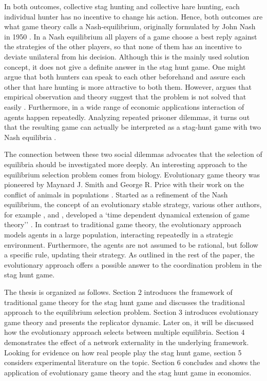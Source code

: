 In both outcomes, collective stag hunting and collective hare hunting,
each individual hunter has no incentive to change his action.
Hence, both outcomes are what game theory calls a Nash-equilibrium, originally
formulated by John Nash in 1950 \parencite{nash_equilibrium_1950}. In a 
Nash equilibrium all players of a game choose a best reply against
the strategies of the other players, so that none of them has an incentive
to deviate unilateral from his decision. Although this is the mainly used
solution concept, it does not give a definite answer in the stag hunt game.
One might argue that both hunters can speak to each other beforehand and
assure each other that hare hunting is more attractive to both them. 
However, \textcite{camerer_behavioral_2003}
argues that empirical observation and theory suggest that the problem is 
not solved that easily .
Furthermore, in a wide range of economic applications interaction of agents
happen repeatedly. Analyzing repeated prisoner dilemmas, it turns 
out that the resulting game can actually be interpreted as a stag-hunt game with
two Nash equilibria \parencite{skyrms_stag_2004}.

The connection between these two social dilemmas advocates that
the selection of equilibria should be investigated more deeply. 
An interesting approach to the equilibrium selection problem comes from
biology. Evolutionary game theory was pioneered by Maynard J. Smith and George
R. Price with their work on the conflict of animals in populations 
\parencite{smith_lhe_1973}. Started as a refinement of the Nash equilibrium,
the concept of an evolutionary stable strategy, various other authors, for 
example \textcite{taylor_evolutionary_1978}, \textcite{hofbauer_note_1979} and
\textcite{zeeman_dynamics_1981}, developed a `time dependent dynamical
extension of game theory'' \parencite[55]{hanauske_evolutionare_2011}.
In contrast to traditional game theory, the evolutionary approach  models
agents in a large population, interacting repeatedly in a strategic environment. 
Furthermore, the agents are not assumed to be rational, but follow a specific 
rule, updating their strategy. 
As outlined in the rest of the paper, the
evolutionary approach offers a possible answer to the coordination
problem in the stag hunt game.

The thesis is organized as follows. Section 2 introduces the 
framework of traditional game theory for the stag hunt game and discusses
the traditional approach to the equilibrium selection problem. Section 3
introduces evolutionary game theory and presents the replicator dynamic. 
Later on, it will be discussed how the evolutionary approach selects
between multiple equilibria. Section 4 demonstrates the effect of a
network externality in the underlying framework. Looking for evidence on
how real people play the stag hunt game, section 5 considers experimental
literature on the topic. Section 6 concludes and shows the application of
evolutionary game theory and the stag hunt game in economics.

